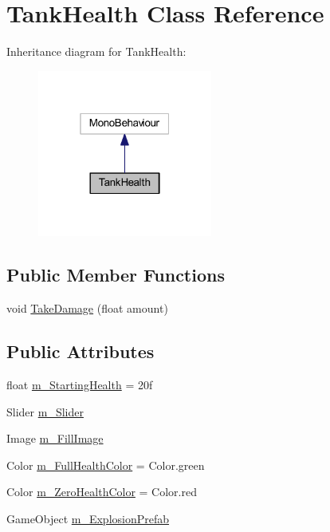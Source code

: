 \hypertarget{class_tank_health}{}\section{Tank\+Health Class Reference}
\label{class_tank_health}


Inheritance diagram for Tank\+Health\+:
\nopagebreak
\begin{figure}[H]
\begin{center}
\leavevmode
\includegraphics[width=163pt]{class_tank_health__inherit__graph}
\end{center}
\end{figure}
\subsection*{Public Member Functions}
\begin{DoxyCompactItemize}
\item 
void \hyperlink{class_tank_health_a5b4692ca0cdcd290c19819b612a1fb6a}{Take\+Damage} (float amount)
\end{DoxyCompactItemize}
\subsection*{Public Attributes}
\begin{DoxyCompactItemize}
\item 
float \hyperlink{class_tank_health_a61f61a506cd75b2382f40c87f376f547}{m\+\_\+\+Starting\+Health} = 20f
\item 
Slider \hyperlink{class_tank_health_a4b41b54ea2d3515d6c258f2dfa352d91}{m\+\_\+\+Slider}
\item 
Image \hyperlink{class_tank_health_afe7189f28749f37650eaee5bbe1e9569}{m\+\_\+\+Fill\+Image}
\item 
Color \hyperlink{class_tank_health_a42ae2cdb01a927ac318e292a408ee530}{m\+\_\+\+Full\+Health\+Color} = Color.\+green
\item 
Color \hyperlink{class_tank_health_aa0c52687011855683ffb71b787f159fb}{m\+\_\+\+Zero\+Health\+Color} = Color.\+red
\item 
Game\+Object \hyperlink{class_tank_health_a5ef8047ad181f98b49f021dcb2a79eff}{m\+\_\+\+Explosion\+Prefab}
\end{DoxyCompactItemize}



